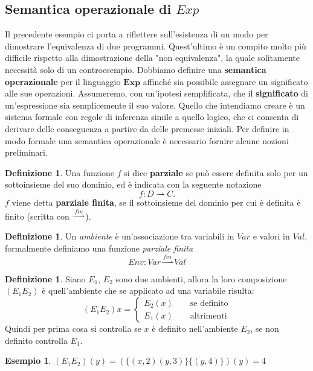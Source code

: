 \documentclass{article}
\theoremstyle{definition}
\theoremstyle{definition}
\theoremstyle{definition}
\newtheorem{definition}[theorem]{Definizione}
\newtheorem{example}[theorem]{Esempio}
\theoremstyle{remark}
\begin{document}
\subsection{Semantica operazionale di $Exp$}
Il precedente esempio ci porta a riflettere sull'esistenza di un modo per dimostrare
l'equivalenza di due programmi. Quest'ultimo è un compito molto più difficile rispetto alla
dimostrazione della "non equivalenza", la quale solitamente necessità solo di un controesempio.
Dobbiamo  definire una \textbf{semantica operazionale} per il linguaggio $\boldsymbol{Exp}$ affinché sia possibile assegnare
un significato alle sue operazioni. Assumeremo, con un'ipotesi semplificata, che il \textbf{significato} di un'espressione sia semplicemente il suo
valore. Quello che intendiamo creare è un sistema formale con regole di inferenza simile a quello logico, che ci consenta di derivare delle conseguenza a partire da delle premesse iniziali.
Per definire in modo formale una semantica operazionale è necessario fornire alcune
nozioni preliminari.
\begin{definition}
    Una funzione $f$ si dice \textbf{parziale} se può essere definita solo per un sottoinsieme del suo dominio, ed è indicata con la seguente notazione
    $$f: D\rightharpoonup C.$$
    $f$ viene detta \textbf{parziale finita}, se il sottoinsieme del dominio per cui è definita è finito (scritta con $\overset{fin}\rightharpoonup$).

\end{definition}
\begin{definition}
    Un \textit{ambiente} è un'associazione tra variabili in $Var$ e valori in $Val$, formalmente definiamo una funzione \textit{parziale finita}
    $$Env:Var\overset{fin}\rightharpoonup Val$$
\end{definition}
\begin{definition}
    Siano $E_1$, $E_2$ sono due ambienti, allora la loro composizione $(E_1E_2)$ è quell'ambiente  che se applicato ad una variabile risulta:
    $$(E_1E_2)x =\left\{ \begin{array}{cl}E_2(x) \qquad \text{se definito} \\
            E_1(x) \qquad \text{altrimenti}\end{array} \right.$$
    Quindi per prima cosa si controlla se $x$ è definito nell'ambiente $E_2$, se non definito controlla $E_1$.
\end{definition}
\begin{example}$(E_1E_2)(y) = (\{(x,2)(y,3)\}\{(y,4)\})(y) = 4$\end{example}
\end{document}
